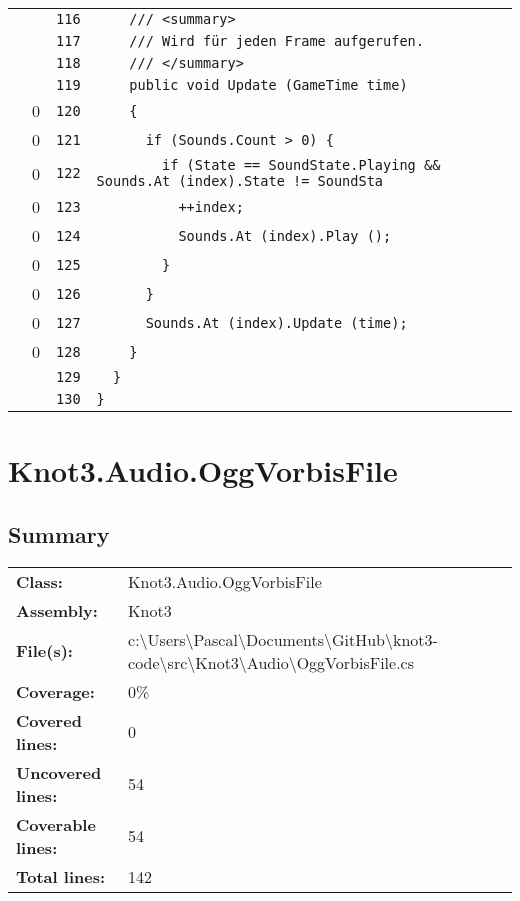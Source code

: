 \documentclass[a4paper,10pt]{article}
\begin{document}
\begin{longtable}[l]{lrrl}
\cellcolor{gray} &  & \verb~116~ & \verb~    /// <summary>~\\
\cellcolor{gray} &  & \verb~117~ & \verb~    /// Wird für jeden Frame aufgerufen.~\\
\cellcolor{gray} &  & \verb~118~ & \verb~    /// </summary>~\\
\cellcolor{gray} &  & \verb~119~ & \verb~    public void Update (GameTime time)~\\
\cellcolor{red} & 0 & \verb~120~ & \verb~    {~\\
\cellcolor{red} & 0 & \verb~121~ & \verb~      if (Sounds.Count > 0) {~\\
\cellcolor{red} & 0 & \verb~122~ & \verb~        if (State == SoundState.Playing && Sounds.At (index).State != SoundSta~\\
\cellcolor{red} & 0 & \verb~123~ & \verb~          ++index;~\\
\cellcolor{red} & 0 & \verb~124~ & \verb~          Sounds.At (index).Play ();~\\
\cellcolor{red} & 0 & \verb~125~ & \verb~        }~\\
\cellcolor{red} & 0 & \verb~126~ & \verb~      }~\\
\cellcolor{red} & 0 & \verb~127~ & \verb~      Sounds.At (index).Update (time);~\\
\cellcolor{red} & 0 & \verb~128~ & \verb~    }~\\
\cellcolor{gray} &  & \verb~129~ & \verb~  }~\\
\cellcolor{gray} &  & \verb~130~ & \verb~}~\\
\end{longtable}
\newpage
\section{Knot3.Audio.OggVorbisFile}
\subsection{Summary}
\begin{longtable}[l]{ll}
\textbf{Class:} & Knot3.Audio.OggVorbisFile\\
\textbf{Assembly:} & Knot3\\
\textbf{File(s):} & \begin{minipage}[t]{12cm}{c:\textbackslash Users\textbackslash Pascal\textbackslash Documents\textbackslash GitHub\textbackslash knot3-code\textbackslash src\textbackslash Knot3\textbackslash Audio\textbackslash OggVorbisFile.cs}\end{minipage} \\
\textbf{Coverage:} & 0\%\\
\textbf{Covered lines:} & 0\\
\textbf{Uncovered lines:} & 54\\
\textbf{Coverable lines:} & 54\\
\textbf{Total lines:} & 142\\
\end{longtable}
\end{document}
